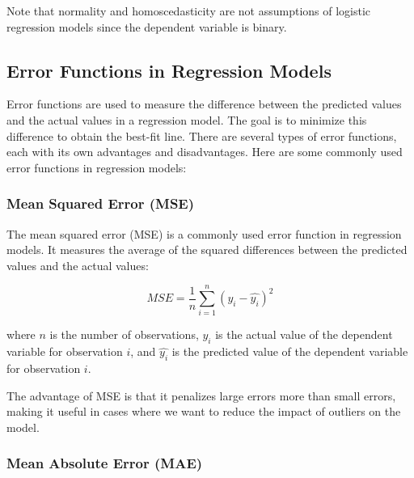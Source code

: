 \documentclass{article}
\begin{document}
Note that normality and homoscedasticity are not assumptions of logistic regression models since the dependent variable is binary.

\subsection{Error Functions in Regression Models}

Error functions are used to measure the difference between the predicted values and the actual values in a regression model. The goal is to minimize this difference to obtain the best-fit line. There are several types of error functions, each with its own advantages and disadvantages. Here are some commonly used error functions in regression models:

\subsubsection{Mean Squared Error (MSE)}
\begin{center}
    \end{center}
The mean squared error (MSE) is a commonly used error function in regression models. It measures the average of the squared differences between the predicted values and the actual values:

\begin{equation}
MSE = \frac{1}{n}\sum_{i=1}^{n}(y_i - \hat{y_i})^2
\end{equation}

where $n$ is the number of observations, $y_i$ is the actual value of the dependent variable for observation $i$, and $\hat{y_i}$ is the predicted value of the dependent variable for observation $i$.

The advantage of MSE is that it penalizes large errors more than small errors, making it useful in cases where we want to reduce the impact of outliers on the model.
\subsubsection{Mean Absolute Error (MAE)}
\end{document}
